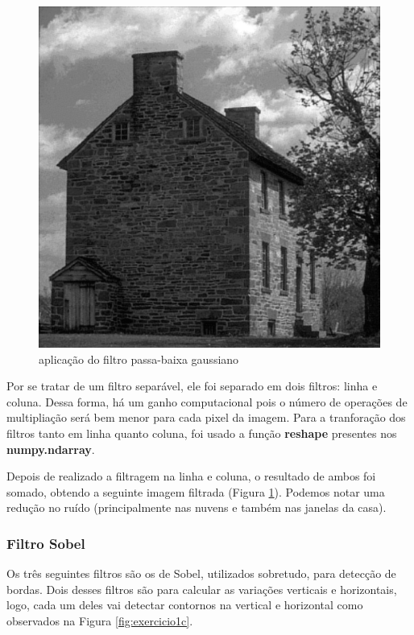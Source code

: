 \documentclass{article}
\begin{document}
\begin{figure}[h!]
    \includegraphics[width=\linewidth]{results/exercicio1b.png}
    \caption{aplicação do filtro passa-baixa gaussiano}
    \label{fig:exercicio1b}
\end{figure}


Por se tratar de um filtro separável, ele foi separado em dois filtros: linha e coluna. Dessa forma, há um ganho computacional pois o número de operações de multipliação será bem menor para cada pixel da imagem. Para a tranforação dos filtros tanto em linha quanto coluna, foi usado a função \textbf{reshape} presentes nos \textbf{numpy.ndarray}.

Depois de realizado a filtragem na linha e coluna, o resultado de ambos foi somado, obtendo a seguinte imagem filtrada (Figura \ref{fig:exercicio1b}). Podemos notar uma redução no ruído (principalmente nas nuvens e também nas janelas da casa).

\subsubsection{Filtro Sobel}

Os três seguintes filtros são os de Sobel, utilizados sobretudo, para detecção de bordas. Dois desses filtros são para calcular as variações verticais e horizontais, logo, cada um deles vai detectar contornos na vertical e horizontal como observados na Figura \ref{fig:exercicio1c}.
\end{document}
